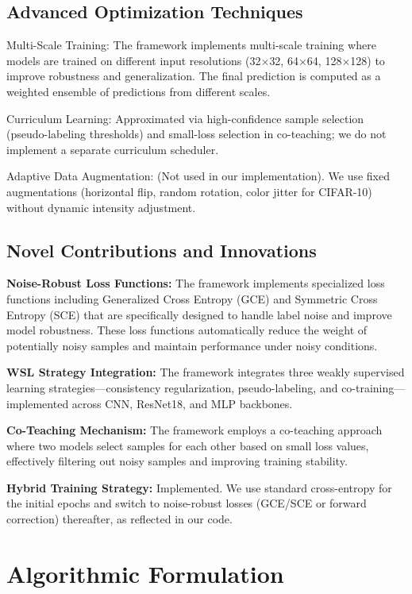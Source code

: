 \documentclass{ieeeaccess}
\begin{document}
\subsection{Advanced Optimization Techniques}
Multi-Scale Training: The framework implements multi-scale training where models are trained on different input resolutions (32$\times$32, 64$\times$64, 128$\times$128) to improve robustness and generalization. The final prediction is computed as a weighted ensemble of predictions from different scales.

Curriculum Learning: Approximated via high-confidence sample selection (pseudo-labeling thresholds) and small-loss selection in co-teaching; we do not implement a separate curriculum scheduler.

Adaptive Data Augmentation: (Not used in our implementation). We use fixed augmentations (horizontal flip, random rotation, color jitter for CIFAR-10) without dynamic intensity adjustment.

\subsection{Novel Contributions and Innovations}
\textbf{Noise-Robust Loss Functions:} The framework implements specialized loss functions including Generalized Cross Entropy (GCE) and Symmetric Cross Entropy (SCE) that are specifically designed to handle label noise and improve model robustness. These loss functions automatically reduce the weight of potentially noisy samples and maintain performance under noisy conditions.

\textbf{WSL Strategy Integration:} The framework integrates three weakly supervised learning strategies—consistency regularization, pseudo-labeling, and co-training—implemented across CNN, ResNet18, and MLP backbones.

\textbf{Co-Teaching Mechanism:} The framework employs a co-teaching approach where two models select samples for each other based on small loss values, effectively filtering out noisy samples and improving training stability.

\textbf{Hybrid Training Strategy:} Implemented. We use standard cross-entropy for the initial epochs and switch to noise-robust losses (GCE/SCE or forward correction) thereafter, as reflected in our code.

\section{Algorithmic Formulation}
\label{sec:algorithm}
\end{document}
